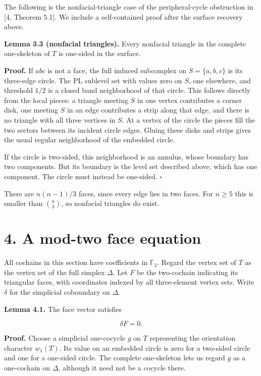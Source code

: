 \documentclass[11pt]{article}
\begin{document}
The following is the nonfacial-triangle case of the peripheral-cycle obstruction in [4, Theorem 5.1]. We include a self-contained proof after the surface recovery above.

\textbf{Lemma 3.3 (nonfacial triangles).} Every nonfacial triangle in the complete one-skeleton of $T$ is one-sided in the surface.

\textbf{Proof.} If $abc$ is not a face, the full induced subcomplex on $S=\{a,b,c\}$ is its three-edge circle. The PL sublevel set with values zero on $S$, one elsewhere, and threshold $1/2$ is a closed band neighborhood of that circle. This follows directly from the local pieces: a triangle meeting $S$ in one vertex contributes a corner disk, one meeting $S$ in an edge contributes a strip along that edge, and there is no triangle with all three vertices in $S$. At a vertex of the circle the pieces fill the two sectors between its incident circle edges. Gluing these disks and strips gives the usual regular neighborhood of the embedded circle.

If the circle is two-sided, this neighborhood is an annulus, whose boundary has two components. But its boundary is the level set described above, which has one component. The circle must instead be one-sided. $\square$

There are $n(n-1)/3$ faces, since every edge lies in two faces. For $n\ge5$ this is smaller than $\binom n3$, so nonfacial triangles do exist.

\section*{4. A mod-two face equation}

All cochains in this section have coefficients in $\mathbb F_2$. Regard the vertex set of $T$ as the vertex set of the full simplex $\Delta$. Let $F$ be the two-cochain indicating its triangular faces, with coordinates indexed by all three-element vertex sets. Write $\delta$ for the simplicial coboundary on $\Delta$.

\textbf{Lemma 4.1.} The face vector satisfies

\[
\delta F=0.
\]

\textbf{Proof.} Choose a simplicial one-cocycle $g$ on $T$ representing the orientation character $w_1(T)$. Its value on an embedded circle is zero for a two-sided circle and one for a one-sided circle. The complete one-skeleton lets us regard $g$ as a one-cochain on $\Delta$, although it need not be a cocycle there.
\end{document}
